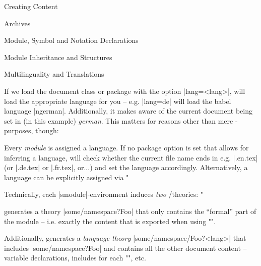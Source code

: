 \begin{sfragment}{Creating \sTeX Content}
  \begin{sfragment}[id=sec.stexarchives]{\sTeX Archives}
    
  \end{sfragment}

  \begin{sfragment}[id=sec.decls]{Module, Symbol and Notation Declarations}
    

    
  \end{sfragment}

  \begin{sfragment}{Module Inheritance and Structures}

    \begin{sfragment}{Multilinguality and Translations}

      If we load the \sTeX document class or package with the option
      |lang=<lang>|, \sTeX will load the appropriate 
      language for you -- e.g. |lang=de| will load the babel
      language |ngerman|. Additionally, it makes \sTeX aware
      of the current document being set in (in this example)
      \emph{german}. This matters for reasons other than mere
      -purposes, though:

      Every \emph{module} is assigned a language. If no \sTeX
      package option is set that allows for inferring a language,
      \sTeX will check whether the current file name ends in
      e.g. |.en.tex| (or |.de.tex| or |.fr.tex|, or...) and
      set the language accordingly. Alternatively, a language
      can be explicitly assigned via 
      \stexcode"\fi

      \begin{mmtbox}
        Technically, each |smodule|-environment induces \emph{two}
        \omdoc/\mmt theories:
        \stexcode"\fi
        generates a theory |some/namespace?Foo| that only contains
        the ``formal'' part of the module -- i.e. exactly the
        content that is exported when using \stexcode"\importmodule".

        Additionally, \mmt generates a \emph{language theory} 
        |some/namespace/Foo?<lang>| that includes |some/namespace?Foo|
        and contains all the other document content -- variable
        declarations, includes for each \stexcode"\usemodule", etc.
      \end{mmtbox}


\end{sfragment}
\end{sfragment}
\end{sfragment}
